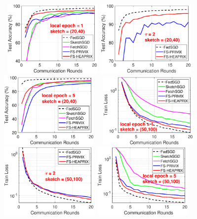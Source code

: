 \documentclass{article} %
\begin{document}
\begin{figure}[h]
\begin{center}
		\mbox{%
		\includegraphics[width=1.9in]{MNIST_figures/local1_sketch20_iid1_test_acc.eps} %
		\includegraphics[width=1.9in]{MNIST_figures/local2_sketch20_iid1_test_acc.eps} %
		\includegraphics[width=1.9in]{MNIST_figures/local5_sketch20_iid1_test_acc.eps}%
		}
		\mbox{%
		\includegraphics[width=1.9in]{MNIST_figures/local1_sketch50_iid1_train_loss.eps}%
		\includegraphics[width=1.9in]{MNIST_figures/local2_sketch50_iid1_train_loss.eps} %
		\includegraphics[width=1.9in]{MNIST_figures/local5_sketch50_iid1_train_loss.eps}}

\end{center}
\end{figure}
\end{document}

